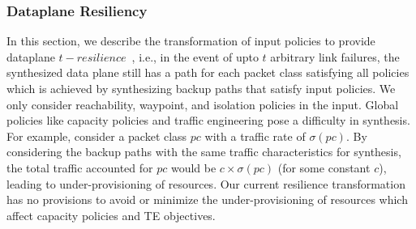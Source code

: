 

\subsubsection{Dataplane Resiliency}
\label{sec:resiliency}


In this section, we describe the transformation of input policies to
provide dataplane $t-resilience$~\cite{plinko}, i.e., in the event of
upto $t$ arbitrary link failures, the synthesized data plane still has
a path for each packet class satisfying all policies which is achieved
by synthesizing backup paths that satisfy input policies.  We only
consider reachability, waypoint, and isolation policies in the input.
Global policies like capacity policies and traffic engineering pose a
difficulty in synthesis. For example, consider a packet class $pc$
with a traffic rate of $\sigma(pc)$. By considering the backup paths
with the same traffic characteristics for synthesis, the total traffic
accounted for $pc$ would be $c\times \sigma(pc)$ (for some constant
$c$), leading to under-provisioning of resources. Our current
resilience transformation has no provisions to avoid or minimize the
under-provisioning of resources which affect capacity policies and TE
objectives.

